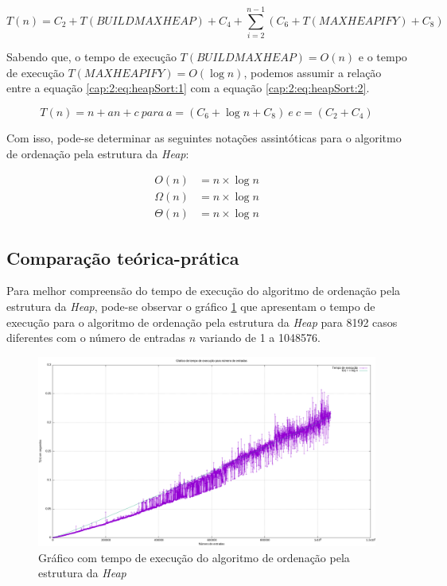 \begin{equation} \label{cap:2:eq:heapSort:1}
    T(n) = C_2 + T(BUILDMAXHEAP) + C_4 + \sum_{i=2}^{n - 1}(C_6 + T(MAXHEAPIFY) + C_8)
\end{equation}

Sabendo que, o tempo de execução $T(BUILDMAXHEAP) = O(n)$ e o tempo de execução $T(MAXHEAPIFY) = O(\log n)$, podemos assumir
a relação entre a equação \ref{cap:2:eq:heapSort:1} com a equação \ref{cap:2:eq:heapSort:2}.

\begin{equation} \label{cap:2:eq:heapSort:2}
    T(n) = n + an + c\  para\  a = (C_6 + \log n + C_8)\  e\  c = (C_2 + C_4)
\end{equation}

Com isso, pode-se determinar as seguintes notações assintóticas para o algoritmo de ordenação 
pela estrutura da \textit{Heap}:

\begin{align*} \label{cap:2:eq:heapSort:3}
    O(n) &= n \times \log n \\ 
    \Omega(n) &= n \times \log n \\
    \Theta(n) &= n \times \log n
\end{align*}

\subsection{Comparação teórica-prática}

Para melhor compreensão do tempo de execução do algoritmo de ordenação pela estrutura da \textit{Heap}, pode-se observar o gráfico 
\ref{cap:2:graph:heapSort} que apresentam o tempo de execução para o algoritmo de ordenação pela estrutura da \textit{Heap}
para 8192 casos diferentes com o número de entradas $n$ variando de 1 a 1048576.

\begin{figure}[h]
    \centering
    \includegraphics[width=\textwidth]{image/graphics/heapSort.png}
    \caption{Gráfico com tempo de execução do algoritmo de ordenação pela estrutura da \textit{Heap}}
    \label{cap:2:graph:heapSort}
\end{figure}

